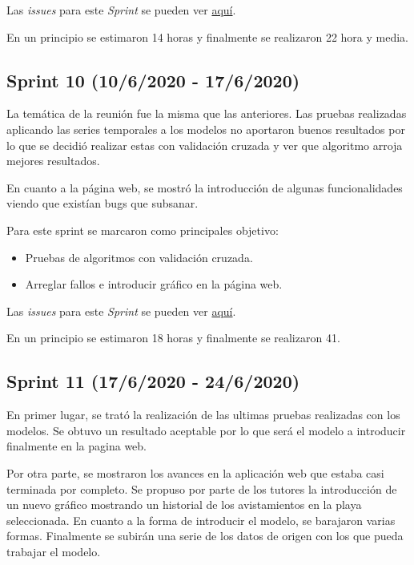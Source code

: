 Las \emph{issues} para este \emph{Sprint} se pueden ver \href{https://github.com/psnti/TFG-Pablo-Santidrian-Tudanca/milestone/9}{aquí}.


En un principio se estimaron 14 horas y finalmente se realizaron 22 hora y media.

\subsection{Sprint 10 (10/6/2020 - 17/6/2020)}\label{Sprint-10}

La temática de la reunión fue la misma que las anteriores. Las pruebas realizadas aplicando las series temporales a los modelos no aportaron buenos resultados por lo que se decidió realizar estas con validación cruzada y ver que algoritmo arroja mejores resultados.

En cuanto a la página web, se mostró la introducción de algunas funcionalidades viendo que existían bugs que subsanar.

Para este sprint se marcaron como principales objetivo:
\begin{itemize}
	\item Pruebas de algoritmos con validación cruzada.
	\item Arreglar fallos e introducir gráfico en la página web.
\end{itemize} 

Las \emph{issues} para este \emph{Sprint} se pueden ver \href{https://github.com/psnti/TFG-Pablo-Santidrian-Tudanca/milestone/10}{aquí}.


En un principio se estimaron 18 horas y finalmente se realizaron 41.

\subsection{Sprint 11 (17/6/2020 - 24/6/2020)}\label{Sprint-11}

En primer lugar, se trató la realización de las ultimas pruebas realizadas con los modelos. Se obtuvo un resultado aceptable por lo que será el modelo a introducir finalmente en la pagina web. 

Por otra parte, se mostraron los avances en la aplicación web que estaba casi terminada por completo. Se propuso por parte de los tutores la introducción de un nuevo gráfico mostrando un historial de los avistamientos en la playa seleccionada. En cuanto a la forma de introducir el modelo, se barajaron varias formas. Finalmente se subirán una serie de los datos de origen con los que pueda trabajar el modelo.

